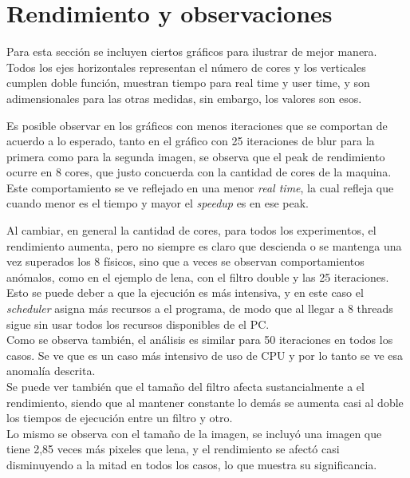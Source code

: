 \documentclass[letterpaper,10pt]{article}
\begin{document}
\section{Rendimiento y observaciones}

Para esta sección se incluyen ciertos gráficos para ilustrar de mejor manera.\\

Todos los ejes horizontales representan el número de cores y los verticales cumplen doble función, muestran tiempo para real time y user time, y son adimensionales para las otras medidas, sin embargo, los valores son esos.

Es posible observar en los gráficos con menos iteraciones que se comportan de acuerdo a lo esperado, tanto en el gráfico con 25 iteraciones de blur para la primera como para la segunda imagen, se observa que el peak de rendimiento ocurre en 8 cores, que justo concuerda con la cantidad de cores de la maquina. \\

Este comportamiento se ve reflejado en una menor \textit{real time}, la cual refleja que cuando menor es el tiempo y mayor el \textit{speedup} es en ese peak.

Al cambiar, en general la cantidad de cores, para todos los experimentos, el rendimiento aumenta, pero no siempre es claro que descienda o se mantenga una vez superados los 8 físicos, sino que a veces se observan comportamientos anómalos, como en el ejemplo de lena, con el filtro double y las 25 iteraciones. Esto se puede deber a que la ejecución es más intensiva, y en este caso el \textit{scheduler} asigna más recursos a el programa, de modo que al llegar a 8 threads sigue sin usar todos los recursos disponibles de el PC.\\

Como se observa también, el análisis es similar para 50 iteraciones en todos los casos. Se ve que es un caso más intensivo de uso de CPU y por lo tanto se ve esa anomalía descrita.\\

Se puede ver también que el tamaño del filtro afecta sustancialmente a el rendimiento, siendo que al mantener constante lo demás se aumenta casi al doble los tiempos de ejecución entre un filtro y otro.\\

Lo mismo se observa con el tamaño de la imagen, se incluyó una imagen que tiene 2,85 veces más pixeles que lena, y el rendimiento se afectó casi disminuyendo a la mitad en todos los casos, lo que muestra su significancia.\\
\end{document}
